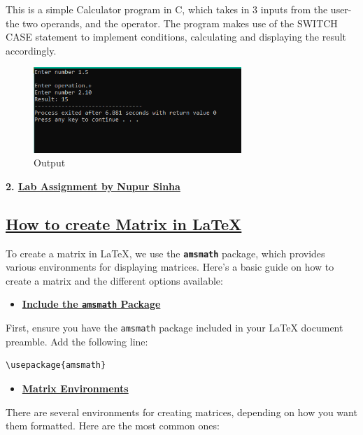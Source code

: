 \documentclass{article}
\begin{document}
\centering

\large This is a simple Calculator program in C, which takes in 3 inputs from the user- the two operands, and the operator. The program makes use of the SWITCH CASE statement to implement conditions, calculating and displaying the result accordingly.

\vspace{1.3cm}

\begin{figure}[h!]
    \centering
    \includegraphics[width=0.7\textwidth]{calculator2.PNG}
    \caption{Output}
\end{figure}

\newpage

\begin{center}
    \LARGE{\textbf{2. \underline{Lab Assignment by Nupur Sinha}}}
\end{center}
\vspace{0.2cm}
 \begin{center}
     \section*{\underline{How to create Matrix in LaTeX}}
\end{center}
\LARGE{To create a matrix in LaTeX, we use the \texttt{\textbf{amsmath}} package, which provides various environments for displaying matrices. Here’s a basic guide on how to create a matrix and the different options available:}
\vspace{0.1cm}
\begin{center}
\begin{itemize}
    \item{\underline{\textbf{Include the \texttt{amsmath} Package}}}
\end{itemize} 
\end{center}
First, ensure you have the \texttt{amsmath} package included in your LaTeX document preamble. Add the following line:
\begin{verbatim}
\usepackage{amsmath}
\end{verbatim}
\begin{center}
    \begin{itemize}
        \item {\textbf{\underline{Matrix Environments}}}
    \end{itemize}
\end{center}
\LARGE{
There are several environments for creating matrices, depending on how you want them formatted. Here are the most common ones:}
\end{document}
